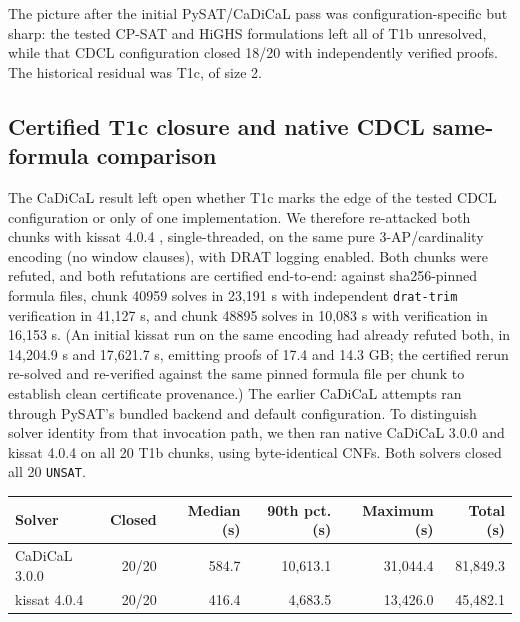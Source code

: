 The picture after the initial PySAT/CaDiCaL pass was configuration-specific
but sharp: the tested CP-SAT and HiGHS formulations left all of T1b
unresolved, while that CDCL configuration closed 18/20 with independently
verified proofs. The historical residual was T1c, of size 2.

\subsection{Certified T1c closure and native CDCL same-formula comparison}
\label{kissat-closes-t1c}

The CaDiCaL result left open whether T1c marks the edge of the tested CDCL
configuration or only of one implementation. We therefore re-attacked both
chunks with kissat 4.0.4 \cite{biere-cadical}, single-threaded, on the same
pure 3-AP/cardinality encoding (no window clauses), with DRAT logging
enabled. Both chunks were refuted, and both refutations are certified
end-to-end: against sha256-pinned formula files, chunk 40959 solves in
23,191 s with independent \texttt{drat-trim} verification in 41,127 s,
and chunk 48895 solves in 10,083 s with verification in 16,153 s. (An
initial kissat run on the same encoding had already refuted both, in
14,204.9 s and 17,621.7 s, emitting proofs of 17.4 and 14.3 GB; the
certified rerun re-solved and re-verified against the same pinned
formula file per chunk to establish clean certificate provenance.)
The earlier CaDiCaL attempts ran through PySAT's bundled backend and default
configuration. To distinguish solver identity from that invocation path, we
then ran native CaDiCaL 3.0.0 and kissat 4.0.4 on all 20 T1b chunks, using
byte-identical CNFs. Both solvers closed all 20 \texttt{UNSAT}.

{\def\LTcaptype{none} %
\begin{longtable}[]{@{}lrrrrr@{}}
\toprule\noalign{}
Solver & Closed & Median (s) & 90th pct. (s) & Maximum (s) & Total (s) \\
\midrule\noalign{}
\endhead
\bottomrule\noalign{}
\endlastfoot
CaDiCaL 3.0.0 & 20/20 & 584.7 & 10,613.1 & 31,044.4 & 81,849.3 \\
kissat 4.0.4 & 20/20 & 416.4 & 4,683.5 & 13,426.0 & 45,482.1 \\
\end{longtable}
}

